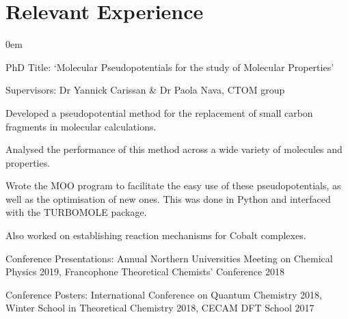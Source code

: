 \documentclass[letterpaper]{deedy-resume-openfont} %
\begin{document}
\hfill
%
%
\begin{minipage}[t]{0.66\textwidth} %


\section{Relevant Experience}


\vspace{\topsep} %
\begin{tightemize}
\itemsep0em
\item PhD Title: `Molecular Pseudopotentials for the study of Molecular Properties'
\item Supervisors: Dr Yannick Carissan \& Dr Paola Nava, CTOM group
\item Developed a pseudopotential method for the replacement of small carbon fragments in molecular calculations.
\item Analysed the performance of this method across a wide variety of molecules and properties.
\item Wrote the MOO program to facilitate the easy use of these pseudopotentials, as well as the optimisation of new ones. This was done in Python and interfaced with the TURBOMOLE package.
\item Also worked on establishing reaction mechanisms for Cobalt complexes.
\item Conference Presentations: Annual Northern Universities Meeting on Chemical Physics 2019, Francophone Theoretical Chemists' Conference 2018
\item Conference Posters: International Conference on Quantum Chemistry 2018, Winter School in Theoretical Chemistry 2018, CECAM DFT School 2017
\end{tightemize}

\sectionspace %



\end{minipage}
\end{document}
